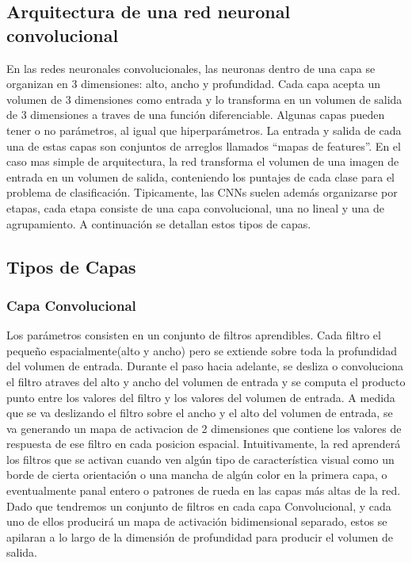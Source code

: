 \documentclass[a4paper,11pt,spanish]{book}
\begin{document}
    \subsection {Arquitectura de una red neuronal convolucional}
      En las redes neuronales convolucionales, las neuronas dentro de una capa se organizan en 3 dimensiones: alto, ancho y profundidad.
      Cada capa acepta un volumen de 3 dimensiones como entrada y lo transforma en un volumen de salida de 3 dimensiones a traves de una función diferenciable.
      Algunas capas pueden tener o no parámetros, al igual que hiperparámetros. La entrada y salida de cada una de estas capas son conjuntos de arreglos llamados “mapas de features”.
      En el caso mas simple de arquitectura, la red transforma el volumen de una imagen de entrada en un volumen de salida, conteniendo los puntajes de cada clase para el problema de clasificación.
      Tipicamente, las CNNs suelen además organizarse por etapas, cada etapa consiste de una capa convolucional, una no lineal y una de agrupamiento. 
      A continuación se detallan estos tipos de capas.

    \subsection {Tipos de Capas}
      \subsubsection{Capa Convolucional} 
	Los parámetros consisten en un conjunto de filtros aprendibles. Cada filtro el pequeño espacialmente(alto y ancho) pero se extiende sobre toda la profundidad del volumen de entrada.
	Durante el paso hacia adelante, se desliza o convoluciona el filtro atraves del alto y ancho del volumen de entrada y se computa el producto punto entre los valores del filtro y los valores
	del volumen de entrada. A medida que se va deslizando el filtro sobre el ancho y el alto del volumen de entrada, se va generando un mapa de activacion de 2 dimensiones que contiene los 
	valores de respuesta de ese filtro en cada posicion espacial.
	Intuitivamente, la red aprenderá los filtros que se activan cuando ven algún tipo de característica visual como un borde de cierta orientación o una mancha de algún color en la 
	primera capa, o eventualmente panal entero o patrones de rueda en las capas más altas de la red. Dado que tendremos un conjunto de filtros en cada capa Convolucional, 
	y cada uno de ellos producirá un mapa de activación bidimensional separado, estos se apilaran a lo largo de la dimensión de profundidad para producir el volumen de salida.
\end{document}

